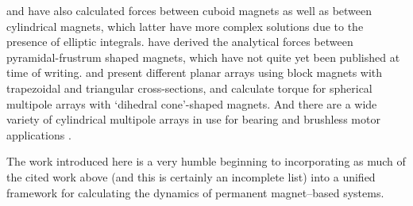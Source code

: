 \textcite{agashe2008-applphys} and \textcite{nagaraj1988} have also calculated forces between cuboid magnets as well as between cylindrical magnets, which latter have more complex solutions due to the presence of elliptic integrals. \textcite{janssen2009-ietm} have derived the analytical forces between pyramidal-frustrum shaped magnets, which have not quite yet been published at time of writing. \textcite{lee2006-mx} and \textcite{cho2001} present different planar arrays using block magnets with trapezoidal and triangular cross-sections, and \textcite{yan2006-iemx} calculate torque for spherical multipole arrays with `dihedral cone'-shaped magnets. And there are a wide variety of cylindrical multipole arrays in use for bearing and brushless motor applications \parencite{zhu2001-ipep}.

The work introduced here is a very humble beginning to incorporating as much of the cited work above (and this is certainly an incomplete list) into a unified framework for calculating the dynamics of permanent magnet--based systems.

